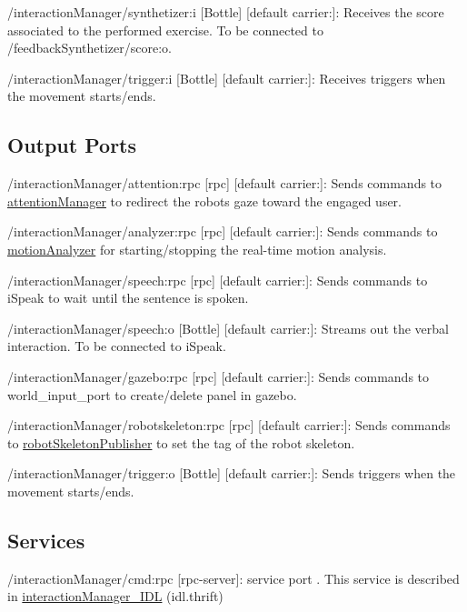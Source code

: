 \begin{DoxyItemize}
\item /interaction\+Manager/synthetizer\+:i \mbox{[}Bottle\mbox{]} \mbox{[}default carrier\+:\mbox{]}\+: Receives the score associated to the performed exercise. To be connected to /feedback\+Synthetizer/score\+:o.
\item /interaction\+Manager/trigger\+:i \mbox{[}Bottle\mbox{]} \mbox{[}default carrier\+:\mbox{]}\+: Receives triggers when the movement starts/ends.
\end{DoxyItemize}\hypertarget{group__skeletonViewer_outputports_sec}{}\subsection{Output Ports}\label{group__skeletonViewer_outputports_sec}

\begin{DoxyItemize}
\item /interaction\+Manager/attention\+:rpc \mbox{[}rpc\mbox{]} \mbox{[}default carrier\+:\mbox{]}\+: Sends commands to \hyperlink{group__attentionManager}{attention\+Manager} to redirect the robot\textquotesingle{}s gaze toward the engaged user.
\item /interaction\+Manager/analyzer\+:rpc \mbox{[}rpc\mbox{]} \mbox{[}default carrier\+:\mbox{]}\+: Sends commands to \hyperlink{group__motionAnalyzer}{motion\+Analyzer} for starting/stopping the real-\/time motion analysis.
\item /interaction\+Manager/speech\+:rpc \mbox{[}rpc\mbox{]} \mbox{[}default carrier\+:\mbox{]}\+: Sends commands to i\+Speak to wait until the sentence is spoken.
\item /interaction\+Manager/speech\+:o \mbox{[}Bottle\mbox{]} \mbox{[}default carrier\+:\mbox{]}\+: Streams out the verbal interaction. To be connected to i\+Speak.
\item /interaction\+Manager/gazebo\+:rpc \mbox{[}rpc\mbox{]} \mbox{[}default carrier\+:\mbox{]}\+: Sends commands to world\+\_\+input\+\_\+port to create/delete panel in gazebo.
\item /interaction\+Manager/robotskeleton\+:rpc \mbox{[}rpc\mbox{]} \mbox{[}default carrier\+:\mbox{]}\+: Sends commands to \hyperlink{group__robotSkeletonPublisher}{robot\+Skeleton\+Publisher} to set the tag of the robot skeleton.
\item /interaction\+Manager/trigger\+:o \mbox{[}Bottle\mbox{]} \mbox{[}default carrier\+:\mbox{]}\+: Sends triggers when the movement starts/ends.
\end{DoxyItemize}\hypertarget{group__skeletonViewer_services_sec}{}\subsection{Services}\label{group__skeletonViewer_services_sec}

\begin{DoxyItemize}
\item /interaction\+Manager/cmd\+:rpc \mbox{[}rpc-\/server\mbox{]}\+: service port . This service is described in \hyperlink{classinteractionManager__IDL}{interaction\+Manager\+\_\+\+I\+DL} (idl.\+thrift) 
\end{DoxyItemize}